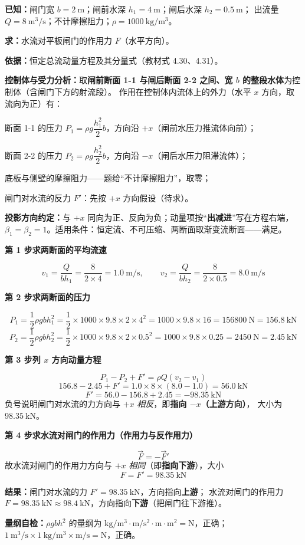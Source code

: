 \begin{jie}
\textbf{已知：}闸门宽 $b=2\ \mathrm{m}$；闸前水深 $h_1=4\ \mathrm{m}$；闸后水深 $h_2=0.5\ \mathrm{m}$；
出流量 $Q=8\ \mathrm{m^3/s}$；不计摩擦阻力；$\rho=1000\ \mathrm{kg/m^3}$。

\textbf{求：}水流对平板闸门的作用力 $F$（水平方向）。

\textbf{依据：}恒定总流动量方程及其分量式（教材式 4.30、4.31）。

\textbf{控制体与受力分析：}取\textbf{闸前断面 1-1 与闸后断面 2-2 之间、宽 $b$ 的整段水体}为控制体（含闸门下方的射流段）。
作用在控制体内流体上的外力（水平 $x$ 方向，取流向为正）有：
\begin{xiaowen}
\item 断面 1-1 的压力 $P_1=\rho g\dfrac{h_1^2}{2}b$，方向沿 $+x$（闸前水压力推流体向前）；
\item 断面 2-2 的压力 $P_2=\rho g\dfrac{h_2^2}{2}b$，方向沿 $-x$（闸后水压力阻滞流体）；
\item 底板与侧壁的摩擦阻力——题给“不计摩擦阻力”，取零；
\item 闸门对水流的反力 $F'$：先按 $+x$ 方向假设（待求）。
\end{xiaowen}
\textbf{投影方向约定：}与 $+x$ 同向为正、反向为负；动量项按“\textbf{出减进}”写在方程右端，
$\beta_1=\beta_2=1$。适用条件：恒定流、不可压缩、两断面取渐变流断面——满足。

\textbf{第 1 步\quad 求两断面的平均流速}

\[ v_1=\frac{Q}{bh_1}=\frac{8}{2\times4}=1.0\ \mathrm{m/s},\qquad
   v_2=\frac{Q}{bh_2}=\frac{8}{2\times0.5}=8.0\ \mathrm{m/s} \]

\textbf{第 2 步\quad 求两断面的压力}

\[ P_1=\frac{1}{2}\rho gbh_1^2=\frac{1}{2}\times1000\times9.8\times2\times4^2
   =1000\times9.8\times16=156800\ \mathrm{N}=156.8\ \mathrm{kN} \]
\[ P_2=\frac{1}{2}\rho gbh_2^2=\frac{1}{2}\times1000\times9.8\times2\times0.5^2
   =1000\times9.8\times0.25=2450\ \mathrm{N}=2.45\ \mathrm{kN} \]

\textbf{第 3 步\quad 列 $x$ 方向动量方程}

\[ P_1-P_2+F'=\rho Q\left(v_2-v_1\right) \]
\[ 156.8-2.45+F'=1.0\times8\times(8.0-1.0)=56.0\ \mathrm{kN} \]
\[ F'=56.0-156.8+2.45=-98.35\ \mathrm{kN} \]
负号说明闸门对水流的力方向与 $+x$ \emph{相反}，即\textbf{指向 $-x$（上游方向）}，
大小为 $98.35\ \mathrm{kN}$。

\textbf{第 4 步\quad 求水流对闸门的作用力（作用力与反作用力）}

\[ \vec{F}=-\vec{F}' \]
故水流对闸门的作用力方向与 $+x$ \emph{相同}（即\textbf{指向下游}），大小
\[ F=F'=98.35\ \mathrm{kN} \]

\textbf{结果：}闸门对水流的力 $F'=98.35\ \mathrm{kN}$，方向指向\textbf{上游}；
水流对闸门的作用力 $F=98.35\ \mathrm{kN}\approx98.4\ \mathrm{kN}$，方向指向\textbf{下游}（把闸门往下游推）。

\textbf{量纲自检：}$\rho gbh^2$ 的量纲为 $\mathrm{kg/m^3\cdot m/s^2\cdot m\cdot m^2}=\mathrm{N}$，正确；
$1\ \mathrm{m^3/s\times1\ kg/m^3\times m/s}=\mathrm{N}$，正确。
\end{jie}

